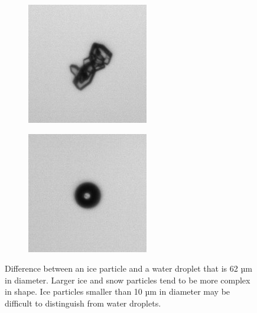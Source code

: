 \begin{figure}[ht]
\centering
\begin{subfigure}[t]{.5\textwidth}
  \centering
  \includegraphics[width=1\linewidth]{figures/litenis1}
  \label{fig:litenis}
\end{subfigure}%
\begin{subfigure}[t]{.5\textwidth}
  \centering
  \includegraphics[width=1\linewidth]{figures/litendroppe1}
  \label{fig:litendroppe}
\end{subfigure}
\caption{Difference between an ice particle and a water droplet that is 62 µm in diameter. Larger ice and snow particles tend to be more complex in shape. Ice particles smaller than 10 µm in diameter may be difficult to distinguish from water droplets.}
\label{fig:icevsdrop}
\end{figure}

